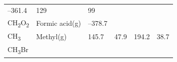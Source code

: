 \documentclass[
  9pt,
]{extbook}
\theoremstyle{definition}
\theoremstyle{definition}
\theoremstyle{definition}
\theoremstyle{remark}
\begin{document}
\begin{longtable}[]{@{}llllll@{}}
\begin{minipage}[t]{0.15\columnwidth}
--361.4\strut
\end{minipage} & \begin{minipage}[t]{0.14\columnwidth}\raggedright
129\strut
\end{minipage} & \begin{minipage}[t]{0.14\columnwidth}\raggedright
99\strut
\end{minipage}\tabularnewline
\begin{minipage}[t]{0.07\columnwidth}\raggedright
CH\textsubscript{2}O\textsubscript{2}\strut
\end{minipage} & \begin{minipage}[t]{0.17\columnwidth}\raggedright
Formic acid(g)\strut
\end{minipage} & \begin{minipage}[t]{0.15\columnwidth}\raggedright
--378.7\strut
\end{minipage} & \begin{minipage}[t]{0.15\columnwidth}\raggedright
\strut
\end{minipage} & \begin{minipage}[t]{0.14\columnwidth}\raggedright
\strut
\end{minipage} & \begin{minipage}[t]{0.14\columnwidth}\raggedright
\strut
\end{minipage}\tabularnewline
\begin{minipage}[t]{0.07\columnwidth}\raggedright
CH\textsubscript{3}\strut
\end{minipage} & \begin{minipage}[t]{0.17\columnwidth}\raggedright
Methyl(g)\strut
\end{minipage} & \begin{minipage}[t]{0.15\columnwidth}\raggedright
145.7\strut
\end{minipage} & \begin{minipage}[t]{0.15\columnwidth}\raggedright
47.9\strut
\end{minipage} & \begin{minipage}[t]{0.14\columnwidth}\raggedright
194.2\strut
\end{minipage} & \begin{minipage}[t]{0.14\columnwidth}\raggedright
38.7\strut
\end{minipage}\tabularnewline
\begin{minipage}[t]{0.07\columnwidth}\raggedright
CH\textsubscript{3}Br\strut
\end{minipage} & \begin{minipage}[t]{0.17\columnwidth}\raggedright

\end{minipage}
\end{longtable}
\end{document}
